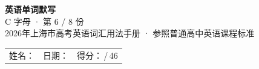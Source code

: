 \documentclass[10pt,a4paper]{article}
\begin{document}
\pagestyle{plain}

\begin{center}
{\LARGE\bfseries 英语单词默写}\\[0.22em]
{\large C 字母 · 第 6 / 8 份}\\[0.18em]
{\small 2026年上海市高考英语词汇用法手册 · 参照普通高中英语课程标准}
\end{center}

\vspace{0.25em}
\noindent\begin{tabular}{@{}p{}@{}p{}@{}p{}@{}}
姓名：\underline{\hspace{2.0cm}} & 日期：\underline{\hspace{2.0cm}} & 得分：\underline{\hspace{1.3cm}}\,/\,46 \\
\end{tabular}

\vspace{0.3em}

\vspace{0.08em}
\end{document}
